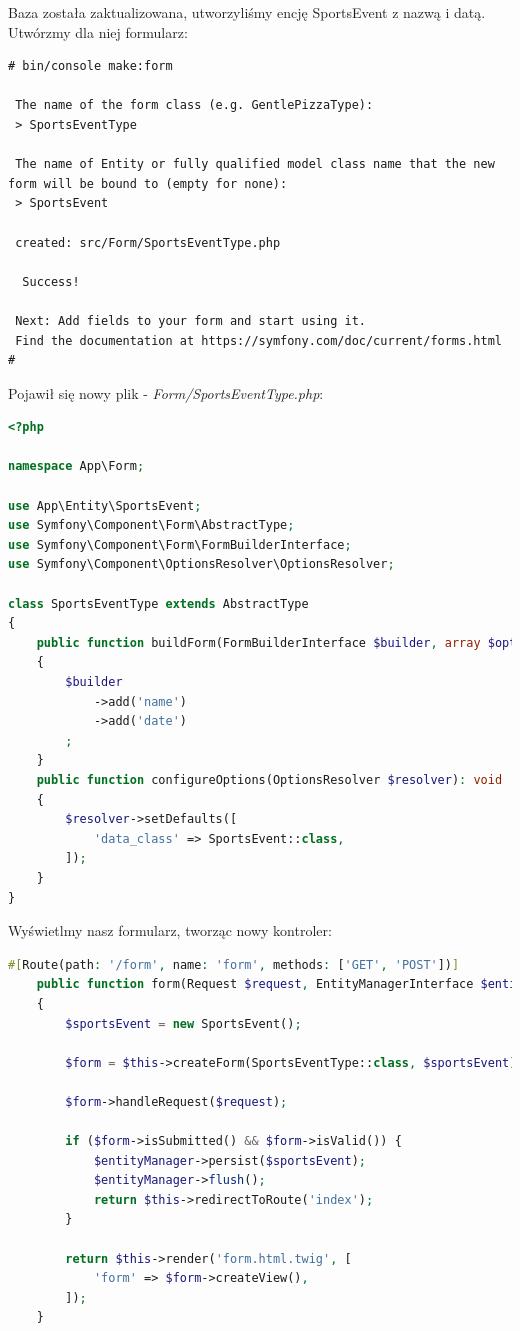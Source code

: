 \documentclass[polish, a4paper]{article}
\begin{document}
Baza została zaktualizowana, utworzyliśmy encję SportsEvent z nazwą i datą. Utwórzmy dla niej formularz:

\begin{verbatim}
# bin/console make:form

 The name of the form class (e.g. GentlePizzaType):
 > SportsEventType

 The name of Entity or fully qualified model class name that the new form will be bound to (empty for none):
 > SportsEvent

 created: src/Form/SportsEventType.php

  Success!

 Next: Add fields to your form and start using it.
 Find the documentation at https://symfony.com/doc/current/forms.html
#
\end{verbatim}

Pojawił się nowy plik - \emph{Form/SportsEventType.php}:

\begin{lstlisting}[language=PHP, caption=Form/SportsEventType.php]
<?php

namespace App\Form;

use App\Entity\SportsEvent;
use Symfony\Component\Form\AbstractType;
use Symfony\Component\Form\FormBuilderInterface;
use Symfony\Component\OptionsResolver\OptionsResolver;

class SportsEventType extends AbstractType
{
    public function buildForm(FormBuilderInterface $builder, array $options): void
    {
        $builder
            ->add('name')
            ->add('date')
        ;
    }
    public function configureOptions(OptionsResolver $resolver): void
    {
        $resolver->setDefaults([
            'data_class' => SportsEvent::class,
        ]);
    }
}
\end{lstlisting}

Wyświetlmy nasz formularz, tworząc nowy kontroler:
\begin{lstlisting}[language=PHP]
    #[Route(path: '/form', name: 'form', methods: ['GET', 'POST'])]
    public function form(Request $request, EntityManagerInterface $entityManager): Response
    {
        $sportsEvent = new SportsEvent();

        $form = $this->createForm(SportsEventType::class, $sportsEvent);

        $form->handleRequest($request);

        if ($form->isSubmitted() && $form->isValid()) {
            $entityManager->persist($sportsEvent);
            $entityManager->flush();
            return $this->redirectToRoute('index');
        }

        return $this->render('form.html.twig', [
            'form' => $form->createView(),
        ]);
    }
\end{lstlisting}
\end{document}
